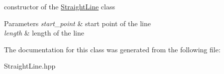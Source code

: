 constructor of the \mbox{\hyperlink{class_straight_line}{Straight\+Line}} class 


\begin{DoxyParams}{Parameters}
{\em start\+\_\+point} & start point of the line \\
\hline
{\em length} & length of the line \\
\hline
\end{DoxyParams}


The documentation for this class was generated from the following file\+:\begin{DoxyCompactItemize}
\item 
Straight\+Line.\+hpp\end{DoxyCompactItemize}
